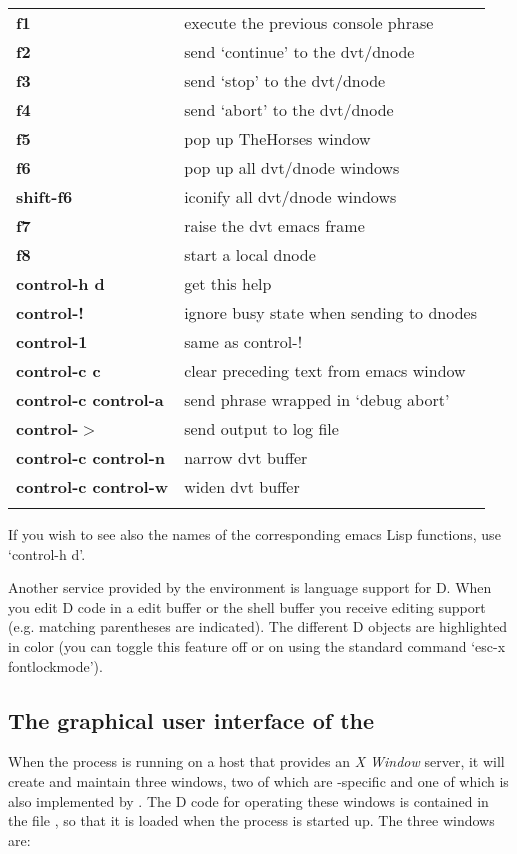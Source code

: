 \begin{tabular}{>{\sffamily\bfseries}l>{\sffamily}l}
    f1 & execute the previous console phrase\\
    f2 & send `continue' to the dvt/dnode\\
    f3 & send `stop' to the dvt/dnode\\
    f4 & send `abort' to the dvt/dnode\\
    f5 & pop up TheHorses window\\
    f6 & pop up all dvt/dnode windows\\
    shift-f6 & iconify all dvt/dnode windows\\
    f7 & raise the dvt emacs frame\\
    f8 & start a local dnode\\
    control-h d & get this help\\
    control-! & ignore busy state when sending to dnodes\\
    control-1 & same as control-!\\
    control-c c & clear preceding text from emacs window\\
    control-c control-a & send phrase wrapped in `debug abort'\\
    control-$>$ & send output to log file\\
    control-c control-n & narrow dvt buffer\\
    control-c control-w & widen dvt buffer\\\\
\end{tabular}

If you wish to see also the names of the corresponding emacs Lisp functions, use `control-h d'.

Another service provided by the  environment is language support for D. When you edit D code in a edit buffer or the shell buffer you receive editing support (e.g. matching parentheses are indicated). The different D objects are highlighted in color (you can toggle this feature off or on using the standard  command `esc-x fontlockmode').

\subsection{The graphical user interface of the  }

When the  process is running on a host that provides an \emph{X Window} server, it will create and maintain three windows, two of which are -specific and one of which is also implemented by . The D code for operating these windows is contained in the file , so that it is loaded when the  process is started up. The three windows are:

